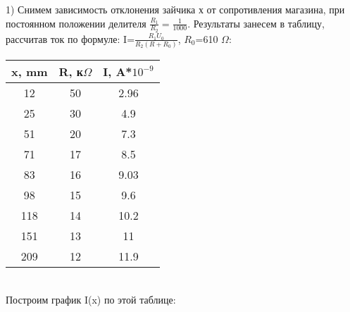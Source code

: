 \documentclass[a4paper,12pt]{article} %
\begin{document}
1) Снимем зависимость отклонения зайчика х от сопротивления магазина, при постоянном положении делителя $\frac{R_1}{R_2}=\frac{1}{1000}$. Результаты занесем в таблицу, рассчитав ток по формуле: I=$\frac{R_{1}U_{0}}{R_{2}(R+R_{0})	}$, $R_0$=610 $\Omega$:\\
\begin{tabular}{|c|c|c|}
\hline 
x, mm & R, к$\Omega$ & I, A*$10^{-9}$ \\ 
\hline 
12 & 50 & 2.96 \\ 
\hline 
25 & 30 & 4.9 \\ 
\hline 
51 & 20 & 7.3 \\ 
\hline 
71 & 17 & 8.5 \\ 
\hline 
83 & 16 & 9.03 \\ 
\hline 
98 & 15 & 9.6 \\ 
\hline 
118 & 14 & 10.2 \\ 
\hline 
151 & 13 & 11 \\ 
\hline 
209 & 12 & 11.9 \\ 
\hline 
\end{tabular}
\\
Построим график I(x) по этой таблице: \\
\begin{flushleft}




\end{flushleft}
\end{document}
